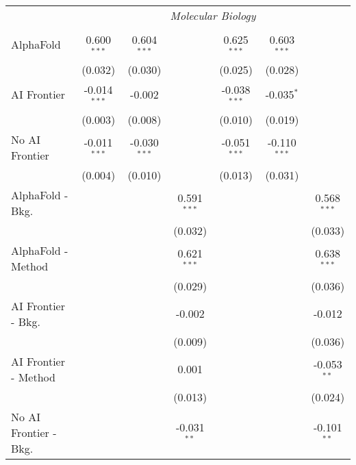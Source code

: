 \begin{tabular}{lcccccc}
 & \multicolumn{6}{c}{\textit{Molecular Biology}} \\ \\
   AlphaFold               & 0.600$^{***}$  & 0.604$^{***}$  &               & 0.625$^{***}$  & 0.603$^{***}$  &   \\   
                           & (0.032)        & (0.030)        &               & (0.025)        & (0.028)        &   \\   
   AI Frontier             & -0.014$^{***}$ & -0.002         &               & -0.038$^{***}$ & -0.035$^{*}$   &   \\   
                           & (0.003)        & (0.008)        &               & (0.010)        & (0.019)        &   \\   
   No AI Frontier          & -0.011$^{***}$ & -0.030$^{***}$ &               & -0.051$^{***}$ & -0.110$^{***}$ &   \\   
                           & (0.004)        & (0.010)        &               & (0.013)        & (0.031)        &   \\   
   AlphaFold - Bkg.        &                &                & 0.591$^{***}$ &                &                & 0.568$^{***}$\\   
                           &                &                & (0.032)       &                &                & (0.033)\\   
   AlphaFold - Method      &                &                & 0.621$^{***}$ &                &                & 0.638$^{***}$\\   
                           &                &                & (0.029)       &                &                & (0.036)\\   
   AI Frontier - Bkg.      &                &                & -0.002        &                &                & -0.012\\   
                           &                &                & (0.009)       &                &                & (0.036)\\   
   AI Frontier - Method    &                &                & 0.001         &                &                & -0.053$^{**}$\\   
                           &                &                & (0.013)       &                &                & (0.024)\\   
   No AI Frontier - Bkg.   &                &                & -0.031$^{**}$ &                &                & -0.101$^{**}$\\   

\end{tabular}
